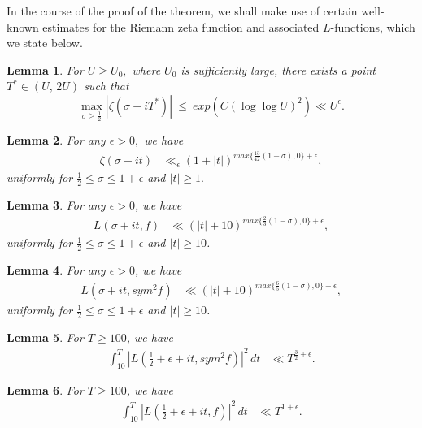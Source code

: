 \documentclass[preprint,12pt]{elsarticle}
\newtheorem{lemma}{Lemma}[section]
\numberwithin{equation}{section}
\begin{document}
In the course of the proof of the theorem, we shall make use of certain well-known estimates for the Riemann zeta function and associated $L$-functions, which we state below. 
\begin{lemma}\cite{Kram}
	\textit{	For $U\geq U_{0},$ where $U_{0}$ is sufficiently large, there exists a point $T^*\in (U,\,2U)$ such that
		$$\max\limits_{\sigma \geq \frac{1}{2}}|\zeta(\sigma\pm iT^*)|~\leq~exp(C(\log\log{U})^{2})\ll U^{\epsilon}.$$}
\end{lemma}
\begin{lemma} \cite{Ylin}
	\textit{	For any $\epsilon>0,$ we have
		\begin{align*}
			\zeta(\sigma+it)&\ll_{\epsilon} (1+|t|)^{max\{\frac{13}{42}(1-\sigma),0\}+\epsilon},
		\end{align*}
		uniformly for $\frac{1}{2}\leq \sigma \leq 1+\epsilon$ and $|t|\geq 1.$}
\end{lemma}
\begin{lemma}\cite{Aivik}
	\textit{For any $\epsilon>0$, we have 
		\begin{align*}
			L(\sigma+it,f)&\ll (|t|+10)^{max\{\frac{2}{3}(1-\sigma),0\}+\epsilon},
		\end{align*}
		uniformly for $\frac{1}{2}\leq \sigma\leq 1+\epsilon$ and $|t|\geq 10$.}
\end{lemma}
\begin{lemma}\cite{Ylin}
	\textit{For any $\epsilon>0$, we have
		\begin{align*}
			L(\sigma+it,sym^{2}f)&\ll (|t|+10)^{max\{\frac{6}{5}(1-\sigma),0\}+\epsilon},
		\end{align*}
		uniformly for $\frac{1}{2}\leq \sigma\leq 1+\epsilon$ and $|t|\geq 10$.}
\end{lemma}
\begin{lemma}\cite{AS}
	\textit{For $T\geq 100$, we have 
		\begin{align*}
			\int_{10}^{T}|L(\frac{1}{2}+\epsilon+it,sym^{2}f)|^{2}\,dt&\ll T^{\frac{3}{2}+\epsilon}.
		\end{align*}
	}
\end{lemma}

\begin{lemma}\cite{Lsankar}
	\textit{
		For $T\geq 100$, we have 
		\begin{align*}
			\int_{10}^{T}|L(\frac{1}{2}+\epsilon+it,f)|^{2}\,dt&\ll T^{1+\epsilon}.
		\end{align*}
	}
\end{lemma}
\end{document}
